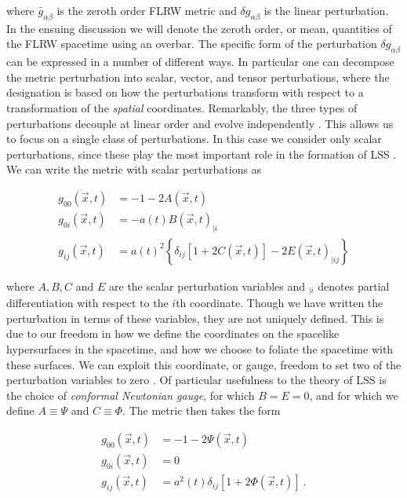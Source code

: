 \documentclass[10pt,letterpaper,final]{iopart}
\numberwithin{equation}{subsection}
\def\ni{\noindent}
\begin{document}
\ni where $\bar{g}_{\alpha\beta}$ is the zeroth order FLRW metric and $\delta g_{\alpha\beta}$ is the linear perturbation. In the ensuing discussion we will denote the zeroth order, or mean, quantities of the FLRW spacetime using an overbar. The specific form of the perturbation $\delta g_{\alpha\beta}$ can be expressed in a number of different ways. In particular one can decompose the metric perturbation into scalar, vector, and tensor perturbations, where the designation is based on how the perturbations transform with respect to a transformation of the \emph{spatial} coordinates. Remarkably, the three types of perturbations decouple at linear order and evolve independently \cite{Dodelson}\cite{Baumann}. This allows us to focus on a single class of perturbations. In this case we consider only scalar perturbations, since these play the most important role in the formation of LSS \cite{Dodelson}. We can write the metric with scalar perturbations as

\begin{align}\label{eq:metric_pert2}
g_{00}(\vec{x},t) &= -1 - 2A(\vec{x},t) \\ 
g_{0i}(\vec{x},t) &= -a(t) B(\vec{x},t)_{|i} \\ 
g_{ij}(\vec{x},t) &= a(t)^2\left\{\delta_{ij}\left[1 + 2C(\vec{x},t)\right] - 2E(\vec{x}, t)_{|ij}\right\}
\end{align}

\ni where $A, B, C$ and $E$ are the scalar perturbation variables and $_{|i}$ denotes partial differentiation with respect to the $i$th coordinate. Though we have written the perturbation in terms of these variables, they are not uniquely defined. This is due to our freedom in how we define the coordinates on the spacelike hypersurfaces in the spacetime, and how we choose to foliate the spacetime with these surfaces. We can exploit this coordinate, or gauge, freedom to set two of the perturbation variables to zero \cite{Dodelson}\cite{Baumann}. Of particular usefulness to the theory of LSS is the choice of \emph{conformal Newtonian gauge}, for which $B = E = 0$, and for which we define $A \equiv \Psi$ and $C \equiv \Phi$. The metric then takes the form

\begin{align}\label{eq:FLRWmetric}
g_{00}(\vec{x},t) &= -1 - 2\Psi(\vec{x},t) \\
g_{0i}(\vec{x},t) &= 0 \\
g_{ij}(\vec{x},t)&= a^2(t)\delta_{ij}\left[1+2\Phi(\vec{x},t)\right] \ .
\end{align}
\end{document}
